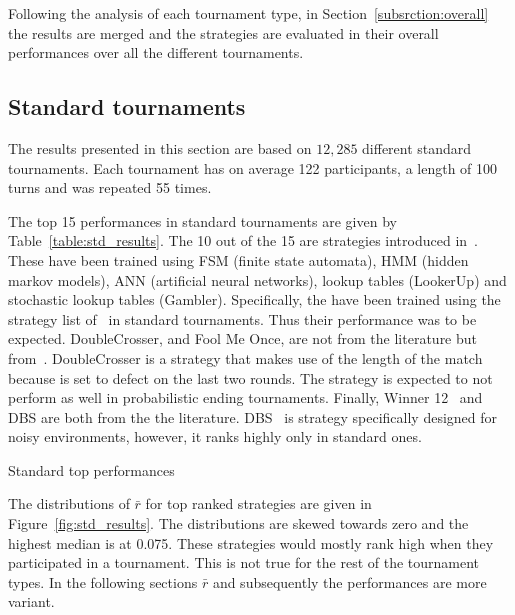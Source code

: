\documentclass{article}
\begin{document}
Following the analysis of each tournament type, in Section~\ref{subsrction:overall}
the results are merged and the strategies are evaluated in their overall performances
over all the different tournaments.

\subsection{Standard tournaments}\label{subsection:standard_tournament}

The results presented in this section are based on $12,285$ different standard
tournaments. Each tournament has on average 122 participants, a length of
100 turns and was repeated 55 times.

The top 15 performances in standard tournaments are given by
Table~\ref{table:std_results}. The 10 out of the 15 are strategies introduced
in~\cite{Harper2017}. These have been trained using FSM (finite state automata),
HMM (hidden markov models), ANN (artificial neural networks), lookup tables
(LookerUp) and stochastic lookup tables (Gambler). Specifically, the have been
trained using the strategy list of~\cite{axelrodproject} in standard
tournaments. Thus their performance was to be expected. DoubleCrosser, and Fool
Me Once, are not from the literature but from~\cite{axelrodproject}.
DoubleCrosser is a strategy that makes use of the length of the match because is
set to defect on the last two rounds. The strategy is expected to not perform as
well in probabilistic ending tournaments. Finally, Winner 12~\cite{Mathieu2017}
and DBS are both from the the literature. DBS~\cite{Au2006} is strategy
specifically designed for noisy environments, however, it ranks highly only in
standard ones.

\begin{table}[!htbp]
    \centering
    \resizebox{.3\textwidth}{!}{
    }
    \caption{Standard top performances}\label{table:std_results}
\end{table}

The distributions of $\bar{r}$ for top ranked strategies are given in
Figure~\ref{fig:std_results}. The distributions are skewed towards zero and the
highest median is at 0.075. These strategies would mostly rank high when they
participated in a tournament. This is not true for the rest of the tournament
types. In the following sections $\bar{r}$ and subsequently the performances are
more variant.
\end{document}
